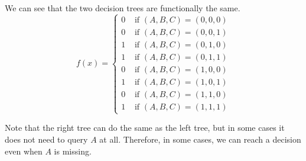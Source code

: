   \begin{example}
    We can see that the two decision trees are functionally the same. 
    \begin{equation}
      f(x) = \begin{cases} 
        0 & \text{ if } (A, B, C) = (0, 0, 0) \\
        0 & \text{ if } (A, B, C) = (0, 0, 1) \\
        1 & \text{ if } (A, B, C) = (0, 1, 0) \\
        1 & \text{ if } (A, B, C) = (0, 1, 1) \\
        0 & \text{ if } (A, B, C) = (1, 0, 0) \\
        1 & \text{ if } (A, B, C) = (1, 0, 1) \\
        0 & \text{ if } (A, B, C) = (1, 1, 0) \\
        1 & \text{ if } (A, B, C) = (1, 1, 1)
      \end{cases}
    \end{equation}

    Note that the right tree can do the same as the left tree, but in some cases it does not need to query $A$ at all. Therefore, in some cases, we can reach a decision even when $A$ is missing.


\end{example}
